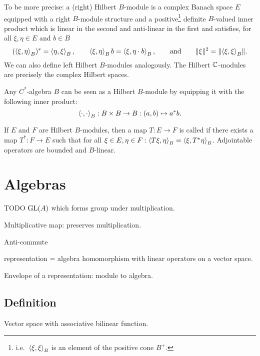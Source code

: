 To be more precise: a (right) Hilbert $B$-module is a complex Banach space $E$ equipped with a right $B$-module structure and a positive\footnote{i.e.\ $\left\langle \xi, \xi \right\rangle_B$ is an element of the positive cone $B^+$.} definite $B$-valued inner product which is linear in the second and anti-linear in the first and satisfies, for all $\xi,\eta \in E$ and $b\in B$
\[ (\left\langle \xi,\eta \right\rangle_B)^* = \left\langle \eta,\xi \right\rangle_B, \qquad \left\langle \xi, \eta \right\rangle_B b = \left\langle \xi,\eta\cdot b \right\rangle_B, \qquad \text{and} \qquad \lVert\xi\rVert^2 = \lVert\left\langle \xi,\xi \right\rangle_B\rVert. \]
We can also define left Hilbert $B$-modules analogously. The Hilbert $\mathbb{C}$-modules are precisely the complex Hilbert spaces.

Any $C^*$-algebra $B$ can be seen as a Hilbert $B$-module by equipping it with the following inner product:
\[ \left\langle \cdot, \cdot \right\rangle_B: B\times B\to B: (a,b) \mapsto a^*b. \]

If $E$ and $F$ are Hilbert $B$-modules, then a map $T: E \to F$ is called  if there exists a map $T^*: F \to E$ such that for all $\xi\in E, \eta\in F: \left\langle T\xi,\eta \right\rangle_B = \left\langle \xi, T^*\eta \right\rangle_B$. Adjointable operators are bounded and $B$-linear.



\chapter{Algebras}
TODO $\operatorname{GL}(A)$ which forms group under multiplication.

Multiplicative map: preserves multiplication.

Anti-commute

representation = algebra homomorphism with linear operators on a vector space.

Envelope of a representation: module to algebra.

\section{Definition}
\begin{definition}
Vector space with associative bilinear function.
\end{definition}


